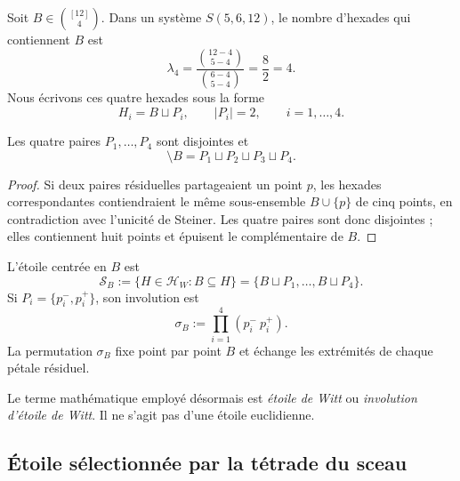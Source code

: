 Soit \(B\in\binom{[12]}4\). Dans un système \(S(5,6,12)\), le nombre
d'hexades qui contiennent \(B\) est
\begin{equation}
 \lambda_4
 =\frac{\binom{12-4}{5-4}}{\binom{6-4}{5-4}}
 =\frac82=4.
 \label{p12-83-c20-s2:eq:lambda-cuatro-w12}
\end{equation}
Nous écrivons ces quatre hexades sous la forme
\[
 H_i=B\sqcup P_i,
 \qquad |P_i|=2,
 \qquad i=1,\ldots,4.
\]

\begin{lemma}
\label{p12-83-c20-s2:lem:particion-residual-tetrada-witt}
Les quatre paires \(P_1,\ldots,P_4\) sont disjointes et
\begin{equation}
 [12]\setminus B
 =P_1\sqcup P_2\sqcup P_3\sqcup P_4.
 \label{p12-83-c20-s2:eq:particion-residual-tetrada-witt}
\end{equation}
\end{lemma}

\begin{proof}
Si deux paires résiduelles partageaient un point \(p\), les hexades
correspondantes contiendraient le même sous-ensemble \(B\cup\{p\}\) de cinq points,
en contradiction avec l'unicité de Steiner. Les quatre paires sont donc
disjointes ; elles contiennent huit points et épuisent le complémentaire de \(B\).
\end{proof}

\begin{definition}
\label{p12-83-c20-s2:def:estrella-witt-involucion}
L'étoile centrée en \(B\) est
\begin{equation}
 \mathscr S_B
 :=\{H\in\mathcal H_W:B\subseteq H\}
 =\{B\sqcup P_1,\ldots,B\sqcup P_4\}.
 \label{p12-83-c20-s2:eq:estrella-witt-general}
\end{equation}
Si \(P_i=\{p_i^-,p_i^+\}\), son involution est
\begin{equation}
 \sigma_B:=\prod_{i=1}^{4}(p_i^-\ p_i^+).
 \label{p12-83-c20-s2:eq:involucion-estrella-witt-general}
\end{equation}
La permutation \(\sigma_B\) fixe point par point \(B\) et échange les
extrémités de chaque pétale résiduel.
\end{definition}

Le terme mathématique employé désormais est \emph{étoile de Witt} ou
\emph{involution d'étoile de Witt}. Il ne s'agit pas d'une étoile
euclidienne.

\subsection{Étoile sélectionnée par la tétrade du sceau}


